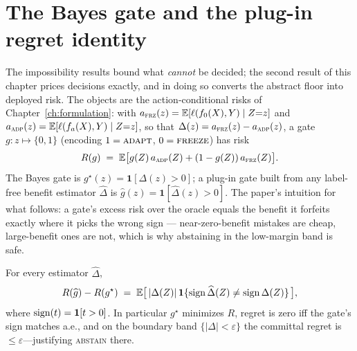 \section{The Bayes gate and the plug-in regret identity}\label{sec:t1-gate}

The impossibility results bound what \emph{cannot} be decided; the second
result of this chapter prices decisions exactly, and in doing so converts
the abstract floor into deployed risk. The objects are the
action-conditional risks of Chapter~\ref{ch:formulation}: with
$a_{\textsc{frz}}(z)=\mathbb{E}[\ell(f_0(X),Y)\mid Z{=}z]$ and
$a_{\textsc{adp}}(z)=\mathbb{E}[\ell(f_a(X),Y)\mid Z{=}z]$, so that
$\Delta(z)=a_{\textsc{frz}}(z)-a_{\textsc{adp}}(z)$, a gate
$g\colon z\mapsto\{0,1\}$ (encoding $1=\textsc{adapt}$,
$0=\textsc{freeze}$) has risk
\[
R(g)\;=\;\mathbb{E}\bigl[g(Z)\,a_{\textsc{adp}}(Z)+(1-g(Z))\,a_{\textsc{frz}}(Z)\bigr].
\]
The Bayes gate is $g^\star(z)=\mathbf1[\Delta(z)>0]$; a plug-in gate built
from any label-free benefit estimator $\widehat\Delta$ is
$\widehat g(z)=\mathbf1[\widehat\Delta(z)>0]$. The paper's intuition for
what follows: a gate's excess risk over the oracle equals the benefit it
forfeits exactly where it picks the wrong sign --- near-zero-benefit
mistakes are cheap, large-benefit ones are not, which is why abstaining in
the low-margin band is safe.

\begin{theorem}\label{thm:gate}
For every estimator $\widehat\Delta$,
\[
R(\widehat g)-R(g^\star)\;=\;\mathbb{E}\big[\,|\Delta(Z)|\,\mathbf1\{\operatorname{sign}\widehat\Delta(Z)\neq\operatorname{sign}\Delta(Z)\}\,\big],
\]
where $\operatorname{sign}(t)=\mathbf1[t>0]$. In particular $g^\star$ minimizes $R$,
regret is zero iff the gate's sign matches a.e., and on the boundary band
$\{|\Delta|<\varepsilon\}$ the committal regret is
$\le\varepsilon$---justifying \textsc{abstain} there.
\end{theorem}

